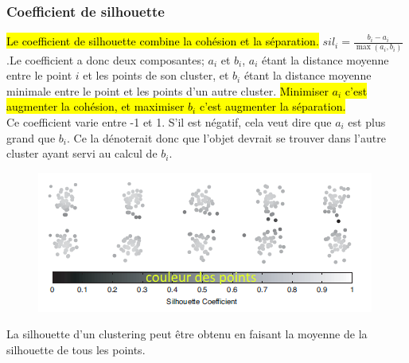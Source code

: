 \documentclass[letterpaper, 12pt]{article}
\newcommand{\alinea}{
\hspace*{0.5cm}}
\begin{document}
			\subsubsection{Coefficient de silhouette}
				\alinea \hl{Le coefficient de silhouette combine la cohésion
					et la séparation.} $sil_i = \frac{b_i - a_i}%
					{\max(a_i, b_i)}$ .Le coefficient a donc deux composantes;
					$a_i$ et $b_i$, $a_i$ étant la distance 
					moyenne entre le point $i$ et les points de son cluster, 
					et $b_i$ étant la distance moyenne minimale 
					entre le point et les points d'un autre cluster.
					\hl{Minimiser $a_i$ c'est augmenter la cohésion,
					et maximiser $b_i$ c'est augmenter la séparation.}\\
				\alinea	Ce coefficient varie entre -1 et 1.
					S'il est négatif, cela veut dire que $a_i$ est 
					plus grand que $b_i$.
					Ce la dénoterait donc que l'objet devrait se trouver
					dans l'autre cluster ayant servi au calcul de $b_i$.\\
				\begin{figure}[H]
					\centering
					\includegraphics[scale=1.0]{Images/silhouette.png}
					\caption{}
					\label{fig:eval:silhouette}
				\end{figure}\noindent
				La silhouette d'un clustering peut être obtenu en faisant
				la moyenne de la silhouette de tous les points.
\end{document}
